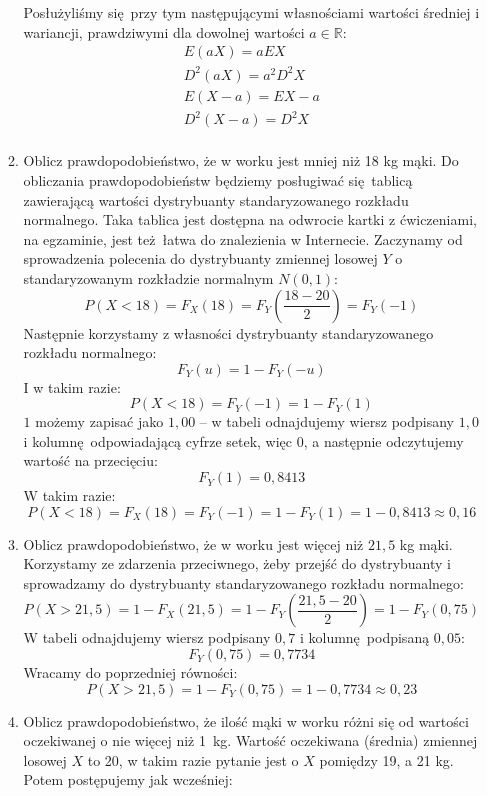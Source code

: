 \documentclass[twoside]{mwart}
\newenvironment{ansenv}{\comment}{\endcomment}
\newenvironment{ansenv}{\paragraph{Odpowiedź:}}{}
\begin{document}
\begin{enumerate}
\begin{enumerate}
\begin{ansenv}
	Posłużyliśmy się przy tym następującymi własnościami wartości średniej i wariancji, prawdziwymi dla dowolnej wartości $a\in\mathbb{R}$:
	\begin{gather*}
	E(aX) = aEX \\
	D^2(aX) = a^2D^2X \\
	E(X-a) = EX-a \\
	D^2(X-a) = D^2X \\
	\end{gather*}
\end{ansenv}
\item Oblicz prawdopodobieństwo, że w worku jest mniej niż 18 kg mąki.
\begin{ansenv}
	Do obliczania prawdopodobieństw będziemy posługiwać się tablicą zawierającą wartości dystrybuanty standaryzowanego rozkładu normalnego. Taka tablica jest dostępna na odwrocie kartki z ćwiczeniami, na egzaminie, jest też łatwa do znalezienia w Internecie.
	Zaczynamy od sprowadzenia polecenia do dystrybuanty zmiennej losowej $Y$ o standaryzowanym rozkładzie normalnym $N(0,1)$:
	\[ P(X<18) = F_X(18) = F_Y\left(\frac{18-20}{2}\right) = F_Y(-1) \]
	Następnie korzystamy z własności dystrybuanty standaryzowanego rozkładu normalnego:
	\[ F_Y(u) = 1-F_Y(-u) \]
	I w takim razie:
	\[ P(X<18) = F_Y(-1)=1-F_Y(1) \]
	$1$ możemy zapisać jako $1{,}00$ -- w tabeli odnajdujemy wiersz podpisany $1{,}0$ i kolumnę odpowiadającą cyfrze setek, więc $0$, a następnie odczytujemy wartość na przecięciu:
	\[ F_Y(1) = 0{,}8413 \]
	W takim razie:
	\[P(X<18)=F_X(18)=F_Y(-1)=1-F_Y(1)=1-0{,}8413\approx 0{,}16\]
\end{ansenv}
\item Oblicz prawdopodobieństwo, że w worku jest więcej niż $21{,}5$ kg mąki.
\begin{ansenv}
	Korzystamy ze zdarzenia przeciwnego, żeby przejść do dystrybuanty i sprowadzamy do dystrybuanty standaryzowanego rozkładu normalnego:
	\[ P(X>21{,}5)=1-F_X(21{,}5)=1-F_Y\left(\frac{21{,}5-20}{2}\right)=1-F_Y(0{,}75) \]
	W tabeli odnajdujemy wiersz podpisany $0{,}7$ i kolumnę podpisaną $0{,}05$:
	\[ F_Y(0{,}75)=0{,}7734 \]
	Wracamy do poprzedniej równości:
	\[ P(X>21{,}5)=1-F_Y(0{,}75) =1-0{,}7734\approx 0{,}23 \]
\end{ansenv}
\item Oblicz prawdopodobieństwo, że ilość mąki w worku różni się od wartości oczekiwanej o nie więcej niż 1~kg.
\begin{ansenv}
	Wartość oczekiwana (średnia) zmiennej losowej $X$ to 20, w takim razie pytanie jest o $X$ pomiędzy 19, a 21 kg. Potem postępujemy jak wcześniej:

\end{ansenv}
\end{enumerate}
\end{enumerate}
\end{document}
